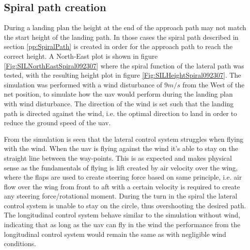 \subsection{Spiral path creation}
During a landing plan the height at the end of the approach path may not match the start height of the landing path. In those cases the spiral path described in section \ref{pp:SpiralPath} is created in order for the approach path to reach the correct height. A North-East plot is shown in figure \ref{Fig:SILNorthEastSpiral092307} where the spiral function of the lateral path was tested, with the resulting height plot in figure \ref{Fig:SILHeightSpiral092307}. The simulation was performed with a wind disturbance of $9 m/s$ from the West of the net position, to simulate how the \gls{uav} would perform during the landing plan with wind disturbance. The direction of the wind is set such that the landing path is directed against the wind, i.e. the optimal direction to land in order to reduce the ground speed of the \gls{uav}. 

From the simulation is seen that the lateral control system struggles when flying with the wind. When the \gls{uav} is flying against the wind it's able to stay on the straight line between the way-points. This is as expected and makes physical sense as the fundamentals of flying is lift created by air velocity over the wing, where the flaps are used to create steering force based on same principle, i.e. air flow over the wing from front to aft with a certain velocity is required to create any steering force/rotational moment. During the turn in the spiral the lateral control system is unable to stay on the circle, thus overshooting the desired path. The longitudinal control system behave similar to the simulation without wind, indicating that as long as the \gls{uav} can fly in the wind the performance from the longitudinal control system would remain the same as with negligible wind conditions.
\newpage


